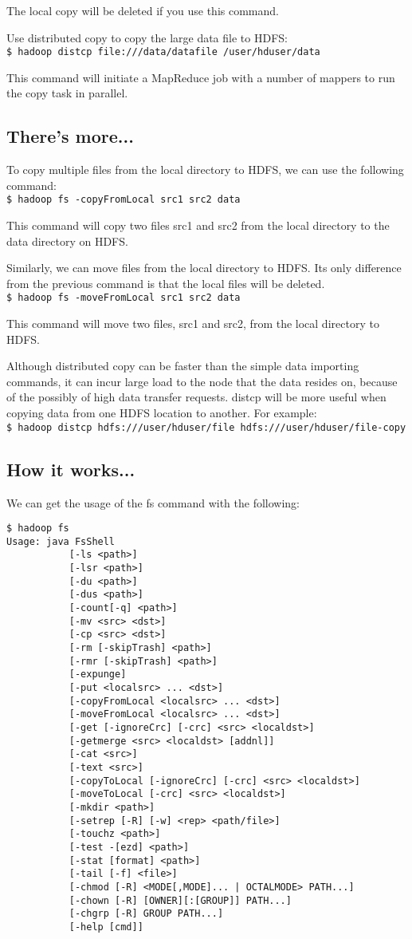 The local copy will be deleted if you use this command.

Use distributed copy to copy the large data file to HDFS: \\
\verb|$ hadoop distcp file:///data/datafile /user/hduser/data |

This command will initiate a MapReduce job with a number of mappers to run the copy task in parallel.

\subsection*{There's more...}
To copy multiple files from the local directory to HDFS, we can use the following command: \\
\verb|$ hadoop fs -copyFromLocal src1 src2 data|

This command will copy two files src1 and src2 from the local directory to the data directory on HDFS.

Similarly, we can move files from the local directory to HDFS. Its only difference from the previous command is that the local files will be deleted. \\
\verb|$ hadoop fs -moveFromLocal src1 src2 data|

This command will move two files, src1 and src2, from the local directory to HDFS.

Although distributed copy can be faster than the simple data importing commands, it can incur large load to the node that the data resides on, because of the possibly of high data transfer requests. distcp will be more useful when copying data from one HDFS location to another. For example: \\
\verb|$ hadoop distcp hdfs:///user/hduser/file hdfs:///user/hduser/file-copy|

\subsection*{How it works...}
We can get the usage of the fs command with the following:
\begin{verbatim}
$ hadoop fs
Usage: java FsShell
           [-ls <path>]
           [-lsr <path>]
           [-du <path>]
           [-dus <path>]
           [-count[-q] <path>]
           [-mv <src> <dst>]
           [-cp <src> <dst>]
           [-rm [-skipTrash] <path>]
           [-rmr [-skipTrash] <path>]
           [-expunge]
           [-put <localsrc> ... <dst>]
           [-copyFromLocal <localsrc> ... <dst>]
           [-moveFromLocal <localsrc> ... <dst>]
           [-get [-ignoreCrc] [-crc] <src> <localdst>]
           [-getmerge <src> <localdst> [addnl]]
           [-cat <src>]
           [-text <src>]
           [-copyToLocal [-ignoreCrc] [-crc] <src> <localdst>]
           [-moveToLocal [-crc] <src> <localdst>]
           [-mkdir <path>]
           [-setrep [-R] [-w] <rep> <path/file>]
           [-touchz <path>]
           [-test -[ezd] <path>]
           [-stat [format] <path>]
           [-tail [-f] <file>]
           [-chmod [-R] <MODE[,MODE]... | OCTALMODE> PATH...]
           [-chown [-R] [OWNER][:[GROUP]] PATH...]
           [-chgrp [-R] GROUP PATH...]
           [-help [cmd]]
\end{verbatim}

